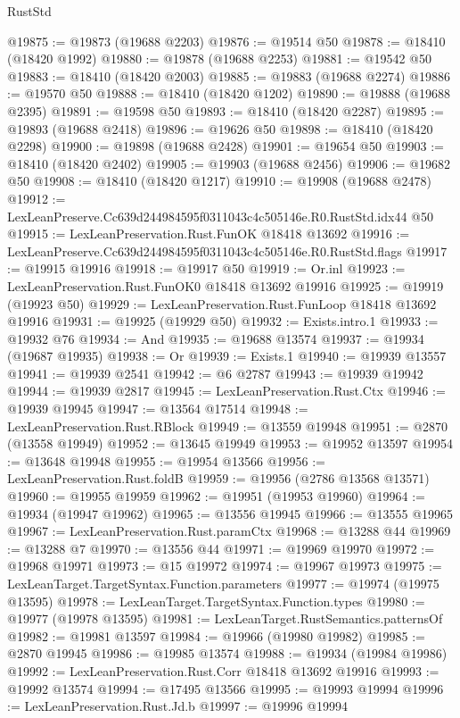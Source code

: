 \begin{lexlean}{RustStd}
\begin{coremodule}
@19875 := @19873 (@19688 @2203)
@19876 := @19514 @50
@19878 := @18410 (@18420 @1992)
@19880 := @19878 (@19688 @2253)
@19881 := @19542 @50
@19883 := @18410 (@18420 @2003)
@19885 := @19883 (@19688 @2274)
@19886 := @19570 @50
@19888 := @18410 (@18420 @1202)
@19890 := @19888 (@19688 @2395)
@19891 := @19598 @50
@19893 := @18410 (@18420 @2287)
@19895 := @19893 (@19688 @2418)
@19896 := @19626 @50
@19898 := @18410 (@18420 @2298)
@19900 := @19898 (@19688 @2428)
@19901 := @19654 @50
@19903 := @18410 (@18420 @2402)
@19905 := @19903 (@19688 @2456)
@19906 := @19682 @50
@19908 := @18410 (@18420 @1217)
@19910 := @19908 (@19688 @2478)
@19912 := LexLeanPreserve.Cc639d244984595f0311043c4c505146e.R0.RustStd.idx44 @50
@19915 := LexLeanPreservation.Rust.FunOK @18418 @13692
@19916 := LexLeanPreserve.Cc639d244984595f0311043c4c505146e.R0.RustStd.flags
@19917 := @19915 @19916
@19918 := @19917 @50
@19919 := Or.inl
@19923 := LexLeanPreservation.Rust.FunOK0 @18418 @13692 @19916
@19925 := @19919 (@19923 @50)
@19929 := LexLeanPreservation.Rust.FunLoop @18418 @13692 @19916
@19931 := @19925 (@19929 @50)
@19932 := Exists.intro.{1}
@19933 := @19932 @76
@19934 := And
@19935 := @19688 @13574
@19937 := @19934 (@19687 @19935)
@19938 := Or
@19939 := Exists.{1}
@19940 := @19939 @13557
@19941 := @19939 @2541
@19942 := @6 @2787
@19943 := @19939 @19942
@19944 := @19939 @2817
@19945 := LexLeanPreservation.Rust.Ctx
@19946 := @19939 @19945
@19947 := @13564 @17514
@19948 := LexLeanPreservation.Rust.RBlock
@19949 := @13559 @19948
@19951 := @2870 (@13558 @19949)
@19952 := @13645 @19949
@19953 := @19952 @13597
@19954 := @13648 @19948
@19955 := @19954 @13566
@19956 := LexLeanPreservation.Rust.foldB
@19959 := @19956 (@2786 @13568 @13571)
@19960 := @19955 @19959
@19962 := @19951 (@19953 @19960)
@19964 := @19934 (@19947 @19962)
@19965 := @13556 @19945
@19966 := @13555 @19965
@19967 := LexLeanPreservation.Rust.paramCtx
@19968 := @13288 @44
@19969 := @13288 @7
@19970 := @13556 @44
@19971 := @19969 @19970
@19972 := @19968 @19971
@19973 := @15 @19972
@19974 := @19967 @19973
@19975 := LexLeanTarget.TargetSyntax.Function.parameters
@19977 := @19974 (@19975 @13595)
@19978 := LexLeanTarget.TargetSyntax.Function.types
@19980 := @19977 (@19978 @13595)
@19981 := LexLeanTarget.RustSemantics.patternsOf
@19982 := @19981 @13597
@19984 := @19966 (@19980 @19982)
@19985 := @2870 @19945
@19986 := @19985 @13574
@19988 := @19934 (@19984 @19986)
@19992 := LexLeanPreservation.Rust.Corr @18418 @13692 @19916
@19993 := @19992 @13574
@19994 := @17495 @13566
@19995 := @19993 @19994
@19996 := LexLeanPreservation.Rust.Jd.b
@19997 := @19996 @19994

\end{coremodule}
\end{lexlean}
